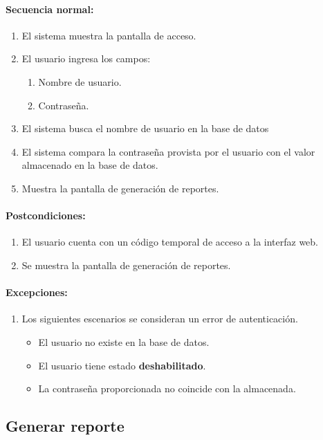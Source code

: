 \paragraph{Secuencia normal:}
\begin{enumerate}
  \item El sistema muestra la pantalla de acceso.
  \item El usuario ingresa los campos:
  \begin{enumerate}
    \item Nombre de usuario.
    \item Contraseña.
  \end{enumerate}
  \item El sistema busca el nombre de usuario en la base de datos
  \item El sistema compara la contraseña provista por el usuario con el valor almacenado en la base de datos.
  \item Muestra la pantalla de generación de reportes.
\end{enumerate}
\paragraph{Postcondiciones:}
\begin{enumerate}
  \item El usuario cuenta con un código temporal de acceso a la interfaz web.
  \item Se muestra la pantalla de generación de reportes.
\end{enumerate}
\paragraph{Excepciones:}
\begin{enumerate}
  \item Los siguientes escenarios se consideran un error de autenticación.
  \begin{itemize}
    \item El usuario no existe en la base de datos.
    \item El usuario tiene estado \textbf{deshabilitado}.
    \item La contraseña proporcionada no coincide con la almacenada. 
  \end{itemize}
\end{enumerate}

\subsection{Generar reporte}\label{cu-generar-reporte}
